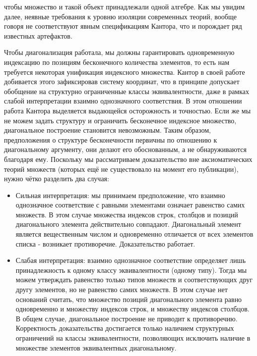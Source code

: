 \documentclass[12pt]{article}
\begin{document}
чтобы множество и такой объект принадлежали одной алгебре. Как мы увидим далее, неявные требования к уровню изоляции современных теорий, вообще говоря не соответствуют явным спецификациям Кантора, что и порождает ряд известных артефактов.

Чтобы диагонализация работала, мы должны гарантировать одновременную индексацию по позициям бесконечного количества элементов, то есть нам требуется некоторая унификация индексного множества. Кантор в своей работе добивается этого зафиксировав систему координат, что в принципе допускает обобщение на структурно ограниченные классы эквивалентности, даже в рамках слабой интерпретации взаимно однозначного соответствия. В этом отношении работа Кантора выделяется выдающейся осторожность и точностью. Если же мы не можем задать структуру и ограничить бесконечное индексное множество, диагональное построение становится невозможным. Таким образом, предположения о структуре бесконечности первичны по отношению к диагональному аргументу, они делают его обоснованным, а не обнаруживаются благодаря ему. Поскольку мы рассматриваем доказательство вне аксиоматических теорий множеств (которых ещё не существовало на момент его публикации), нужно чётко разделить два случая:

\begin{itemize}
    \item Сильная интерпретация: мы принимаем предположение, что взаимно однозначное соответствие с равными элементами означает равенство самих множеств. В этом случае множества индексов строк, столбцов и позиций диагонального элемента действительно совпадают. Диагональный элемент является вещественным числом и одновременно отличается от всех элементов списка - возникает противоречие. Доказательство работает.
    \item Слабая интерпретация: взаимно однозначное соответствие определяет лишь принадлежность к одному классу эквивалентности (одному типу). Тогда мы можем утверждать равенство только типов множеств и соответствующих друг другу элементов, но не равенство самих множеств. В этом случае нет оснований считать, что множество позиций диагонального элемента равно одновременно и множеству индексов строк, и множеству индексов столбцов. В общем случае, диагональное построение не приводит к противоречию. Корректность доказательства достигается только наличием структурных ограничений на классы эквивалентности, позволяющих исключить наличие в множестве элементов эквивалентных диагональному. 
\end{itemize}
\end{document}
